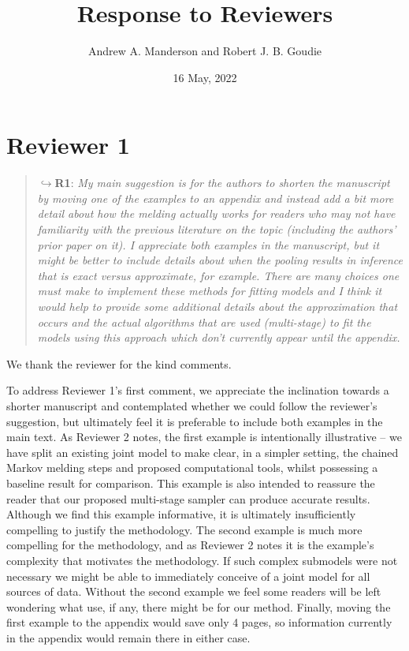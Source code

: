 \documentclass[
  10pt,
  a4paper,
]{article}
\title{Response to Reviewers}
\author{Andrew A. Manderson and Robert J. B. Goudie}
\date{16 May, 2022}
\begin{document}
\maketitle

\hypertarget{reviewer-1}{%
\section*{Reviewer 1}\label{reviewer-1}}

\begin{quote}
\(\hookrightarrow\)\textbf{R1}: \emph{My main suggestion is for the
authors to shorten the manuscript by moving one of the examples to an
appendix and instead add a bit more detail about how the melding
actually works for readers who may not have familiarity with the
previous literature on the topic (including the authors' prior paper on
it). I appreciate both examples in the manuscript, but it might be
better to include details about when the pooling results in inference
that is exact versus approximate, for example. There are many choices
one must make to implement these methods for fitting models and I think
it would help to provide some additional details about the approximation
that occurs and the actual algorithms that are used (multi-stage) to fit
the models using this approach which don't currently appear until the
appendix.}
\end{quote}

We thank the reviewer for the kind comments.

To address Reviewer 1's first comment, we appreciate the inclination
towards a shorter manuscript and contemplated whether we could follow
the reviewer's suggestion, but ultimately feel it is preferable to
include both examples in the main text. As Reviewer 2 notes, the first
example is intentionally illustrative -- we have split an existing joint
model to make clear, in a simpler setting, the chained Markov melding
steps and proposed computational tools, whilst possessing a baseline
result for comparison. This example is also intended to reassure the
reader that our proposed multi-stage sampler can produce accurate
results. Although we find this example informative, it is ultimately
insufficiently compelling to justify the methodology. The second example
is much more compelling for the methodology, and as Reviewer 2 notes it
is the example's complexity that motivates the methodology. If such
complex submodels were not necessary we might be able to immediately
conceive of a joint model for all sources of data. Without the second
example we feel some readers will be left wondering what use, if any,
there might be for our method. Finally, moving the first example to the
appendix would save only 4 pages, so information currently in the
appendix would remain there in either case.
\end{document}
